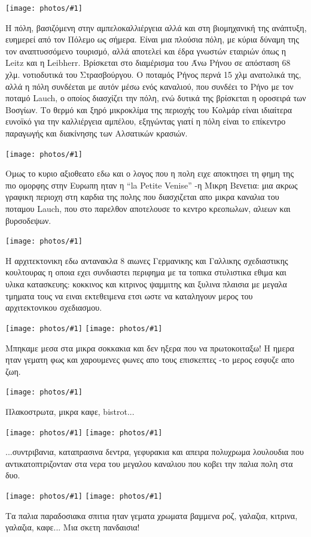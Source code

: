 \documentclass[11pt, letterpaper]{book}
\newcommand\photo[1]{\noindent\texttt{[image: photos/\#1]}}
\begin{document}
\photo{93.jpg}

Η πόλη, βασιζόμενη στην αμπελοκαλλιέργεια αλλά και στη βιομηχανική της ανάπτυξη, ευημερεί από τον Πόλεμο ως σήμερα. Είναι μια πλούσια πόλη, με κύρια δύναμη της τον αναπτυσσόμενο τουρισμό, αλλά αποτελεί και έδρα γνωστών εταιριών όπως η Leitz και η Leibherr.
Βρίσκεται στο διαμέρισμα του Άνω Ρήνου σε απόσταση 68 χλμ. νοτιοδυτικά του Στρασβούργου. Ο ποταμός Ρήνος περνά 15 χλμ ανατολικά της, αλλά η πόλη συνδέεται με αυτόν μέσω ενός καναλιού, που συνδέει το Ρήνο με τον ποταμό Lauch, ο οποίος διασχίζει την πόλη, ενώ δυτικά της βρίσκεται η οροσειρά των Βοσγίων. Το θερμό και ξηρό μικροκλίμα της περιοχής του Κολμάρ είναι ιδιαίτερα ευνοϊκό για την καλλιέργεια αμπέλου, εξηγώντας γιατί η πόλη είναι το επίκεντρο παραγωγής και διακίνησης των Αλσατικών κρασιών.

\photo{94.jpg}

Ομως το κυριο αξιοθεατο εδω και ο λογος που η πολη ειχε αποκτησει τη φημη της πιο ομορφης στην Ευρωπη ηταν η ``la Petite Venise'' -η Μικρη Βενετια: μια ακρως γραφικη περιοχη στη καρδια της πολης που διασχιζεται απο μικρα καναλια του ποταμου Lauch, που στο παρελθον αποτελουσε το κεντρο κρεοπωλων, αλιεων και βυρσοδεψων.

\photo{95.jpg}

Η αρχιτεκτονικη εδω αντανακλα 8 αιωνες Γερμανικης και Γαλλικης σχεδιαστικης κουλτουρας η οποια εχει συνδιαστει περιφημα με τα τοπικα στυλιστικα εθιμα και υλικα κατασκευης: κοκκινος και κιτρινος ψαμμιτης και ξυλινα πλαισια με μεγαλα τμηματα τους να ειναι εκτεθειμενα ετσι ωστε να καταληγουν μερος του αρχιτεκτονικου σχεδιασμου.

\photo{96.jpg}
\photo{97.jpg}

Μπηκαμε μεσα στα μικρα σοκκακια και δεν ηξερα που να πρωτοκοιταξω!
Η ημερα ηταν γεματη φως και χαρουμενες φωνες απο τους επισκεπτες -το μερος εσφυζε απο ζωη.

\photo{98.jpg}

Πλακοστρωτα, μικρα καφε, bistrot...

\photo{99.jpg}
\photo{100.jpg}

...συντριβανια, καταπρασινα δεντρα, γεφυρακια και απειρα πολυχρωμα λουλουδια που αντικατοπτριζονταν στα νερα του μεγαλου καναλιου που κοβει την παλια πολη στα δυο.

\photo{101.jpg}
\photo{102.jpg}

Τα παλια παραδοσιακα σπιτια ηταν γεματα χρωματα βαμμενα ροζ, γαλαζια, κιτρινα, γαλαζια, καφε...
Μια σκετη πανδαισια!
\end{document}
